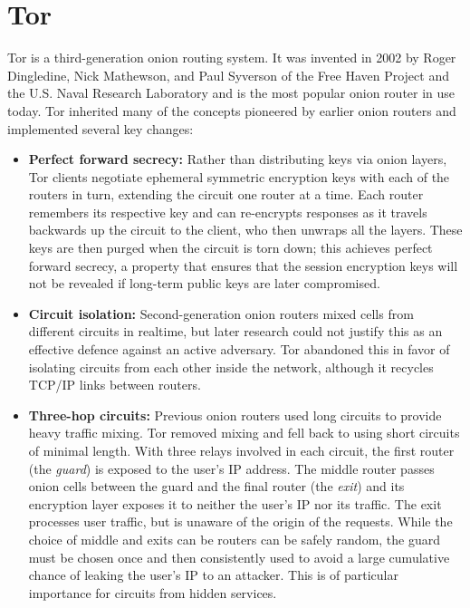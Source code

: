 \section{Tor}

Tor is a third-generation onion routing system. It was invented in 2002 by Roger Dingledine, Nick Mathewson, and Paul Syverson of the Free Haven Project and the U.S. Naval Research Laboratory\cite{dingledine2004tor} and is the most popular onion router in use today. Tor inherited many of the concepts pioneered by earlier onion routers and implemented several key changes:\cite{syverson2011peel}\cite{dingledine2004tor}

\begin{itemize}
	\item \textbf{Perfect forward secrecy:} Rather than distributing keys via onion layers, Tor clients negotiate ephemeral symmetric encryption keys with each of the routers in turn, extending the circuit one router at a time. Each router remembers its respective key and can re-encrypts responses as it travels backwards up the circuit to the client, who then unwraps all the layers. These keys are then purged when the circuit is torn down; this achieves perfect forward secrecy, a property that ensures that the session encryption keys will not be revealed if long-term public keys are later compromised.
	\item \textbf{Circuit isolation:} Second-generation onion routers mixed cells from different circuits in realtime, but later research could not justify this as an effective defence against an active adversary\cite{syverson2011peel}. Tor abandoned this in favor of isolating circuits from each other inside the network, although it recycles TCP/IP links between routers.
	\item \textbf{Three-hop circuits:} Previous onion routers used long circuits to provide heavy traffic mixing. Tor removed mixing and fell back to using short circuits of minimal length. With three relays involved in each circuit, the first router (the \emph{guard}) is exposed to the user's IP address. The middle router passes onion cells between the guard and the final router (the \emph{exit}) and its encryption layer exposes it to neither the user's IP nor its traffic. The exit processes user traffic, but is unaware of the origin of the requests. While the choice of middle and exits can be routers can be safely random, the guard must be chosen once and then consistently used to avoid a large cumulative chance of leaking the user's IP to an attacker. This is of particular importance for circuits from hidden services\cite{overlier2006locating}\cite{bauer2007low}.

\end{itemize}
